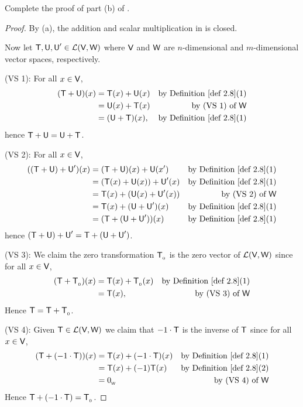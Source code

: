 \begin{exercise} \label{exercise 2.2.6}
Complete the proof of part (b) of .
\end{exercise}

\begin{proof}
By (a), the addition and scalar multiplication in  is closed.

Now let \(\textsf{T}, \textsf{U}, \textsf{U}' \in \mathcal{L}(\textsf{V}, \textsf{W})\) where \(\textsf{V}\) and \(\textsf{W}\) are \(n\)-dimensional and \(m\)-dimensional vector spaces, respectively.

(VS 1): For all \(x \in \textsf{V}\),
\begin{align*}
    (\T + \U)(x) & = \T(x) + \U(x) & \text{by \DEF{2.8}(1)} \\
                 & = \U(x) + \T(x) & \text{by (VS 1) of \(\W\)} \\
                 & = (\U + \T)(x), & \text{by \DEF{2.8}(1)}
\end{align*}
hence \(\textsf{T} + \textsf{U} = \textsf{U} + \textsf{T}\).

(VS 2): For all \(x \in \textsf{V}\),
\begin{align*}
    ((\T + \U) + \U')(x) & = (\T + \U)(x) + \U(x') & \text{by \DEF{2.8}(1)} \\
                         & = (\T(x) + \U(x)) + \U'(x) & \text{by \DEF{2.8}(1)} \\
                         & = \T(x) + (\U(x) + \U'(x)) & \text{by (VS 2) of \(\W\)} \\
                         & = \T(x) + (\U +\U')(x) & \text{by \DEF{2.8}(1)} \\
                         & = (\T + (\U +\U'))(x) & \text{by \DEF{2.8}(1)}
\end{align*}
hence \((\textsf{T} + \textsf{U}) + \textsf{U}' = \textsf{T} + (\textsf{U} + \textsf{U}')\).

(VS 3): We claim the zero transformation \(\textsf{T}_{_0}\) is the zero vector of \(\mathcal{L}(\textsf{V}, \textsf{W})\) since for all \(x \in \textsf{V}\),
\begin{align*}
    (\T + \TZERO)(x) & = \T(x) + \TZERO(x) & \text{by \DEF{2.8}(1)} \\
                     & = \T(x), & \text{by (VS 3) of \(\W\)}
\end{align*}
Hence \(\textsf{T} = \textsf{T} + \textsf{T}_{_0}\).

(VS 4): Given \(\textsf{T} \in \mathcal{L}(\textsf{V}, \textsf{W})\) we claim that \(-1 \cdot \textsf{T}\) is the inverse of \(\textsf{T}\) since for all \(x \in \textsf{V}\),
\begin{align*}
    (\T + (-1 \cdot \T))(x) & = \T(x) + (-1 \cdot \T)(x) & \text{by \DEF{2.8}(1)} \\
                            & = \T(x) + (-1)\T(x) & \text{by \DEF{2.8}(2)} \\
                            & = \OW & \text{by (VS 4) of \(\W\)}
\end{align*}
Hence \(\textsf{T} + (-1 \cdot \textsf{T}) = \textsf{T}_{_0}\).


\end{proof}
